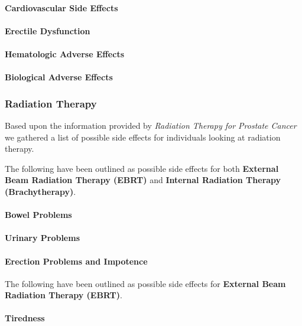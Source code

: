 \documentclass[journal]{vgtc}                %
\begin{document}
                        \paragraph{Cardiovascular Side Effects}
                        \paragraph{Erectile Dysfunction}
                        \paragraph{Hematologic Adverse Effects}
                        \paragraph{Biological Adverse Effects}


                \subsubsection{Radiation Therapy}
                        Based upon the information provided by \textit{Radiation Therapy for Prostate Cancer}\cite{RadiationTherapy:2005} we gathered a list of possible side effects for individuals looking at radiation therapy.

                        The following have been outlined as possible side effects for both \textbf{External Beam Radiation Therapy (EBRT)} and \textbf{Internal Radiation Therapy (Brachytherapy)}.
                        \paragraph{Bowel Problems}
                        \paragraph{Urinary Problems}
                        \paragraph{Erection Problems and Impotence}

                        The following have been outlined as possible side effects for \textbf{External Beam Radiation Therapy (EBRT)}.
                        \paragraph{Tiredness}
\end{document}
